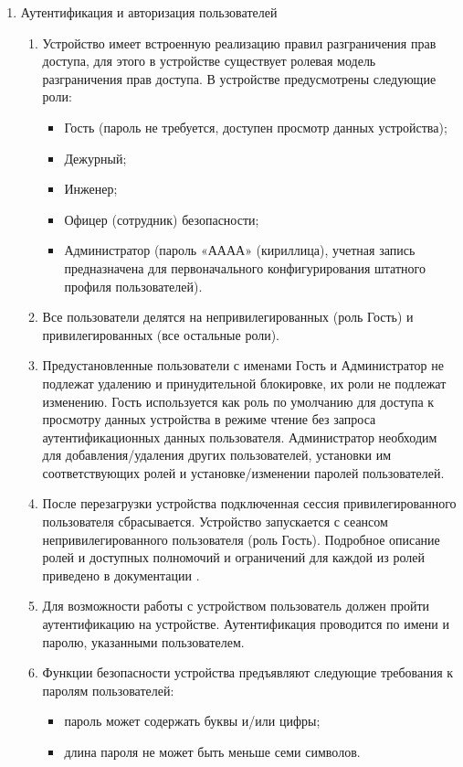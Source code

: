 \begin{enumerate}[label=\arabic{section}.\arabic{subsection}.\arabic*, labelsep=7pt, leftmargin=0pt, itemindent=60pt, align=left]
\item Аутентификация и авторизация пользователей
\begin{enumerate}
\item Устройство имеет встроенную реализацию правил разграничения прав доступа, для этого в устройстве существует ролевая модель разграничения прав доступа.
В устройстве предусмотрены следующие роли:
\begin{itemize}
\item Гость (пароль не требуется, доступен просмотр данных устройства);
\item Дежурный;
\item Инженер;
\item Офицер (сотрудник) безопасности;
\item Администратор (пароль «АААА» (кириллица), учетная запись предназначена для первоначального конфигурирования штатного профиля пользователей).
\end{itemize}
\item Все пользователи делятся на непривилегированных (роль Гость) и привилегированных (все остальные роли).
\item Предустановленные пользователи с именами Гость и Администратор не подлежат удалению и принудительной блокировке, их роли не подлежат изменению.
Гость используется как роль по умолчанию для доступа к просмотру данных устройства в режиме чтение без запроса аутентификационных данных пользователя.
Администратор необходим для добавления/удаления других пользователей, установки им соответствующих ролей и установке/изменении паролей пользователей.
\item После перезагрузки устройства подключенная сессия привилегированного пользователя сбрасывается.
Устройство запускается с сеансом непривилегированного пользователя (роль Гость).
Подробное описание ролей и доступных полномочий и ограничений для каждой из ролей приведено в документации \ManualUnitGeneral.
\item Для возможности работы с устройством пользователь должен пройти аутентификацию на устройстве.
Аутентификация проводится по имени и паролю, указанными пользователем.
\item Функции безопасности устройства предъявляют следующие требования к паролям пользователей:
\begin{itemize}
  \item пароль может содержать буквы и/или цифры;
  \item длина пароля не может быть меньше семи символов.

\end{itemize}
\end{enumerate}
\end{enumerate}
